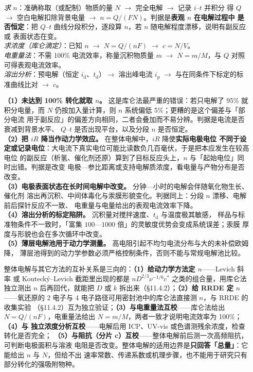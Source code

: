 \begin{dataflow}
\emph{求 $n$}：准确称取（或配制）物质的量 $N$ $\to$ 完全电解 $\to$ 记录 $i$–$t$ 并积分
得 $Q$ $\to$ 空白电解扣除背景电量 $\to$ $n=Q/(FN)$。判据是\textbf{表观 $n$ 在电解过程中
是否恒定}：把 $Q$–$t$ 曲线分段积分，逐段算 $n$，若 $n$ 随电解程度漂移，说明有副反应或
表面状态在变。\\
\emph{求浓度（库仑滴定）}：已知 $n$ $\to$ $N=Q/(nF)$ $\to$ $c=N/V$。\\
\emph{电重量法}：不需 100\% 电流效率，称量沉积物质量 $m$ $\to$
$N=m/M$，与 $Q$ 对照可得表观电流效率。\\
\emph{溶出分析}：预电解（恒定 $i_{\mathrm{d}}$、$t_{\mathrm{d}}$）$\to$ 溶出峰电流
$i_{\mathrm{p}}$ $\to$ 与在同条件下标定的标准曲线比对 $\to$ $c$。
\end{dataflow}

\begin{pitfall}
\textbf{（1）未达到 100\% 转化就取 $n$。} 这是库仑法最严重的错误：若只电解了 95\%
就积分电量，而 $N$ 仍按加入量计算，则 $n$ 系统偏低 5\%；更糟的是这个偏差与「部分电流
用于副反应」的偏差方向相同，二者会叠加而不易分辨。判据是电流是否衰减到背景水平、
$Q$–$t$ 是否出现平台，以及分段 $n$ 是否恒定。\\
\textbf{（2）把 $iR$ 降当作动力学效应。} 在整体电解中，$iR$ 降使\textbf{实际电极电位
不同于设定或记录电位}：大电流下真实电位可能比读数负几百毫伏，于是把本应发生在较高电位
的副反应（析氢、催化剂还原）算到了目标反应头上，$n$ 与「起始电位」同时出错。判据是改变
电极—参比距离或支持电解质浓度，看电量与产物分布是否改变。\\
\textbf{（3）电极表面状态在长时间电解中改变。} 分钟—小时的电解会伴随氧化物生长、催化剂
溶出再沉积、中间体毒化与汞膜形貌变化。判据同上：分段 $n$ 漂移、电解前后探针反应不一致、
电重量与电量给出的表观电流效率下降。\\
\textbf{（4）溶出分析的标定陷阱。} 沉积量对搅拌速度、$t_{\mathrm{d}}$ 与温度极其敏感，
样品与标准物条件不一致时，「富集 $100$—$1000$ 倍」的灵敏度优势会变成系统误差；汞膜
厚度与形貌也会在多次循环中改变。\\
\textbf{（5）薄层电解池用于动力学测量。} 高电阻引起不均匀电流分布与大的未补偿欧姆降，
薄层池得到的动力学参数必须严格控制条件，否则不能与常规电解池比较。
\end{pitfall}

\begin{crosscheck}
整体电解与其它方法的互补关系是三向的：\textbf{（1）给动力学方法定 $n$}——Levich 斜率
或 Koutecký--Levich 截距里出现的都是 $nD^{2/3}\nu^{-1/6}c^{*}$ 之类的组合量，用库仑法
独立测出 $n$ 后再回代，就能把 $D$ 或 $k$ 拆出来（\S 11.4.2）；\textbf{（2）给 RRDE 定
$n$}——氧还原的 2 电子与 4 电子路径可用密封池中的库仑法直接测 $n$，与 RRDE 的收集实验
（\S 11.4.2）互为独立验证；\textbf{（3）与电重量法互校}——库仑法给出
$N=Q/(nF)$，电重量法给出 $N=m/M$，两者一致才说明电流效率为 100\%；\textbf{（4）与
独立浓度分析互校}——电解后用 ICP、UV-vis 或色谱测残余浓度，检查转化是否完全；
\textbf{（5）与阻抗（分片 c）互校}——整体电解前后测一次高频阻抗，可判断电极面积与溶液
电阻是否改变。整体电解的适用边界是\textbf{只回答「总量」}：它能给出 $n$ 与 $N$，但给不出
速率常数、传递系数或机理步骤，也不能用于研究只有部分转化的强吸附物种。
\end{crosscheck}

